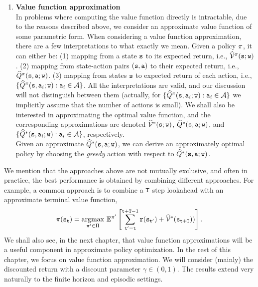 \begin{enumerate}
\item \textbf{Value function approximation}\\
In problems where computing the value function directly is intractable, due to the reasons described above, we consider an approximate value function of some parametric form.
When considering a value function approximation, there are a few interpretations
to what exactly we mean. Given a policy $\pi$, it can either be: (1) mapping from a state
${\tt s}$ to its expected return, i.e.,
$\widehat{\mathcal{V}}^\pi({\tt s};{\tt w})$. (2) mapping from state-action
pairs $({\tt s},{\tt a})$ to their expected return, i.e.,
$\widehat{Q}^\pi({\tt s},{\tt a};{\tt w})$. (3) mapping from
states ${\tt s}$ to expected return of each action, i.e.,
$\{\widehat{Q}^\pi({\tt s},{\tt a}_i;{\tt w}):{\tt a}_i\in
\mathcal{A}\}$. All the interpretations are valid, and our
discussion will not distinguish between them (actually, for
$\{\widehat{Q}^\pi({\tt s},{\tt a}_i;{\tt w}):{\tt a}_i\in
\mathcal{A}\}$ we implicitly assume that the number of actions is
small). We shall also be interested in approximating the optimal value function, and the corresponding approximations are denoted $\widehat{\mathcal{V}}^*({\tt s};{\tt w})$, $\widehat{Q}^*({\tt s},{\tt a};{\tt w})$, and $\{\widehat{Q}^*({\tt s},{\tt a}_i;{\tt w}):{\tt a}_i\in
\mathcal{A}\}$, respectively.\\
Given an approximate $\widehat{Q}^*({\tt s},{\tt a};{\tt w})$, we can derive an approximately optimal policy by choosing the \emph{greedy} action with respect to $\widehat{Q}^*({\tt s},{\tt a};{\tt w})$.
\end{enumerate}

We mention that the approaches above are not mutually exclusive, and often in practice, the best performance is obtained by combining different approaches. For example, a common approach is to combine a ${\tt T}$ step lookahead with an approximate terminal value function, 
\begin{equation*}
    \pi({\tt s}_{\tt t}) = \underset{\pi' \in \Pi}{\operatorname{argmax}}\  \mathbb{E}^{\pi'} \left[\sum_{{\tt t}'={\tt t}}^{{\tt t}+{\tt T}-1} {\tt r}({\tt s}_{{\tt t}'}) + \widehat{\mathcal{V}}^*({\tt s}_{{\tt t}+{\tt T}}))\right].
\end{equation*}
We shall also see, in the next chapter, that value function approximations will be a useful component in approximate policy optimization. In the rest of this chapter, we focus on value function approximation. 
We will consider (mainly) the discounted return with
a discount parameter $\gamma\in(0,1)$. The results extend very
naturally to the finite horizon and episodic settings.

